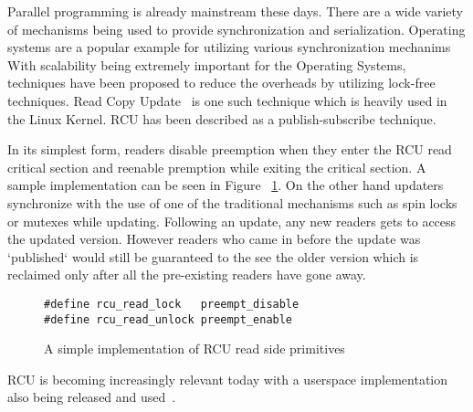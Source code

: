 Parallel programming is already mainstream these days. There are a wide variety
of mechanisms being used to provide synchronization and serialization.
Operating systems are a popular example for utilizing various synchronization
mechanims%
With scalability being extremely important for the Operating Systems,
techniques have been proposed to reduce the overheads by utilizing lock-free
techniques. Read Copy Update~\cite{paulmck:TechReport} is one such technique which is
heavily used in the Linux Kernel. RCU has been described as a publish-subscribe
technique.

In its simplest form, readers disable preemption when they enter the RCU read critical
section and reenable premption while exiting the
critical section. A sample implementation can be seen in Figure ~\ref{fig:rcusimpleread}.
On the other hand updaters synchronize with the use
of one of the traditional mechanisms such as spin locks or mutexes while updating.
Following an update, any new readers gets to access the updated version. However
readers who came in before the update was `published` would still be guaranteed
to the see the older version which is reclaimed only after all the pre-existing
readers have gone away.

\begin{figure}[h]
\centering
\begin{lstlisting}
#define rcu_read_lock	preempt_disable
#define rcu_read_unlock	preempt_enable
\end{lstlisting}
\caption{A simple implementation of RCU read side primitives}\label{fig:rcusimpleread}
\end{figure}

RCU is becoming increasingly relevant today with a userspace implementation also
being released and used~\cite{urcu}.%
~\cite{goulet:thesis}


